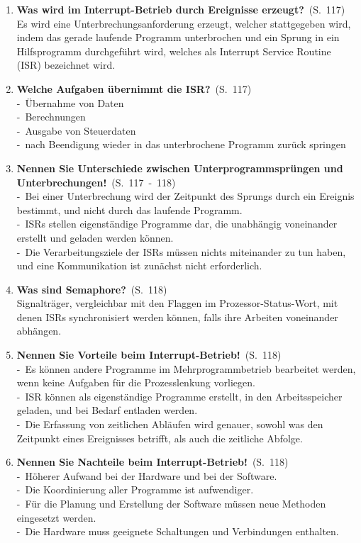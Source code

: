 \documentclass[a4paper,12pt]{article}
\newcommand{\question}[3]{\pagebreak[3]\item {\textbf{#1?}}\ (S.\ #2)#3}
\newcommand{\statement}[3]{\pagebreak[3]\item {\textbf{#1!}}\ (S.\ #2)#3}
\newcommand{\catchword}[1]{\\-\ #1}
\newcommand{\normaltext}[1]{\\#1}
\newcommand{\page}[1]{#1}
\newcommand{\pages}[2]{#1\ -\ #2}
\begin{document}
\begin{enumerate}
  \question{Was wird im Interrupt-Betrieb durch Ereignisse erzeugt}{\page{117}}
  {
    \normaltext{Es wird eine Unterbrechungsanforderung erzeugt, welcher stattgegeben wird, indem das gerade
                laufende Programm unterbrochen und ein Sprung in ein Hilfsprogramm durchgeführt wird,
                welches als Interrupt Service Routine (ISR) bezeichnet wird.}
  }

  \question{Welche Aufgaben übernimmt die ISR}{\page{117}}
  {
    \catchword{Übernahme von Daten}
    \catchword{Berechnungen}
    \catchword{Ausgabe von Steuerdaten}
    \catchword{nach Beendigung wieder in das unterbrochene Programm zurück springen}
  }

  \statement{Nennen Sie Unterschiede zwischen Unterprogrammsprüngen und Unterbrechungen}{\pages{117}{118}}
  {
    \catchword{Bei einer Unterbrechung wird der Zeitpunkt des Sprungs durch ein Ereignis bestimmt, und 
               nicht durch das laufende Programm.}
    \catchword{ISRs stellen eigenständige Programme dar, die unabhängig voneinander erstellt und geladen
               werden können.}
    \catchword{Die Verarbeitungsziele der ISRs müssen nichts miteinander zu tun haben, und eine Kommunikation
               ist zunächst nicht erforderlich.}
  }

  \question{Was sind Semaphore}{\page{118}}
  {
    \normaltext{Signalträger, vergleichbar mit den Flaggen im Prozessor-Status-Wort, mit denen ISRs 
                synchronisiert werden können, falls ihre Arbeiten voneinander abhängen.}
  }

  \statement{Nennen Sie Vorteile beim Interrupt-Betrieb}{\page{118}}
  {
    \catchword{Es können andere Programme im Mehrprogrammbetrieb bearbeitet werden, wenn keine Aufgaben für die 
               Prozesslenkung vorliegen.}
    \catchword{ISR können als eigenständige Programme erstellt, in den Arbeitsspeicher geladen, und bei Bedarf 
               entladen werden.}
    \catchword{Die Erfassung von zeitlichen Abläufen wird genauer, sowohl was den Zeitpunkt eines Ereignisses
               betrifft, als auch die zeitliche Abfolge.}
  }

  \statement{Nennen Sie Nachteile beim Interrupt-Betrieb}{\page{118}}
  {
    \catchword{Höherer Aufwand bei der Hardware und bei der Software.}
    \catchword{Die Koordinierung aller Programme ist aufwendiger.}
    \catchword{Für die Planung und Erstellung der Software müssen neue Methoden eingesetzt werden.}
    \catchword{Die Hardware muss geeignete Schaltungen und Verbindungen enthalten.}
  }


\end{enumerate}
\end{document}
